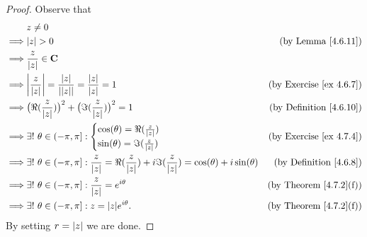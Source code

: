 \begin{proof}
    Observe that
    \begin{align*}
                 & z \neq 0                                                                                                                                                                          \\
        \implies & \abs*{z} > 0                                                                                                                                & \text{(by Lemma \ref{4.6.11})}      \\
        \implies & \frac{z}{\abs*{z}} \in \mathbf{C}                                                                                                                                                 \\
        \implies & \abs*{\frac{z}{\abs*{z}}} = \frac{\abs*{z}}{\abs*{\abs*{z}}} = \frac{\abs*{z}}{\abs*{z}} = 1                                                & \text{(by Exercise \ref{ex 4.6.7})} \\
        \implies & \big(\Re(\frac{z}{\abs*{z}})\big)^2 + \big(\Im(\frac{z}{\abs*{z}})\big)^2 = 1                                                               & \text{(by Definition \ref{4.6.10})} \\
        \implies & \exists!\ \theta \in (-\pi, \pi] : \begin{cases}
            \cos(\theta) = \Re(\frac{z}{\abs*{z}}) \\
            \sin(\theta) = \Im(\frac{z}{\abs*{z}})
        \end{cases}                                                                               & \text{(by Exercise \ref{ex 4.7.4})} \\
        \implies & \exists!\ \theta \in (-\pi, \pi] : \frac{z}{\abs*{z}} = \Re(\frac{z}{\abs*{z}}) + i \Im(\frac{z}{\abs*{z}}) = \cos(\theta) + i \sin(\theta) & \text{(by Definition \ref{4.6.8})}  \\
        \implies & \exists!\ \theta \in (-\pi, \pi] : \frac{z}{\abs*{z}} = e^{i \theta}                                                                        & \text{(by Theorem \ref{4.7.2}(f))}  \\
        \implies & \exists!\ \theta \in (-\pi, \pi] : z = \abs*{z} e^{i \theta}.                                                                               & \text{(by Theorem \ref{4.7.2}(f))}
    \end{align*}
    By setting \(r = \abs*{z}\) we are done.
\end{proof}

